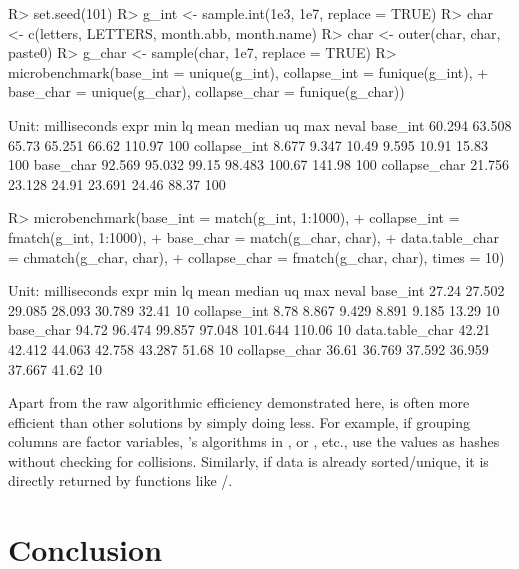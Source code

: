 \documentclass[nojss]{jss} %
\begin{document}
\begin{Schunk}
\begin{Sinput}
R> set.seed(101)
R> g_int <- sample.int(1e3, 1e7, replace = TRUE)
R> char <- c(letters, LETTERS, month.abb, month.name)
R> char <- outer(char, char, paste0)
R> g_char <- sample(char, 1e7, replace = TRUE)
R> microbenchmark(base_int = unique(g_int), collapse_int = funique(g_int),
+              base_char = unique(g_char), collapse_char = funique(g_char))
\end{Sinput}
\begin{Soutput}
Unit: milliseconds
          expr    min     lq  mean median     uq    max neval
      base_int 60.294 63.508 65.73 65.251  66.62 110.97   100
  collapse_int  8.677  9.347 10.49  9.595  10.91  15.83   100
     base_char 92.569 95.032 99.15 98.483 100.67 141.98   100
 collapse_char 21.756 23.128 24.91 23.691  24.46  88.37   100
\end{Soutput}
\begin{Sinput}
R> microbenchmark(base_int = match(g_int, 1:1000),
+                 collapse_int = fmatch(g_int, 1:1000),
+                 base_char = match(g_char, char),
+                 data.table_char = chmatch(g_char, char),
+                 collapse_char = fmatch(g_char, char), times = 10)
\end{Sinput}
\begin{Soutput}
Unit: milliseconds
            expr   min     lq   mean median      uq    max neval
        base_int 27.24 27.502 29.085 28.093  30.789  32.41    10
    collapse_int  8.78  8.867  9.429  8.891   9.185  13.29    10
       base_char 94.72 96.474 99.857 97.048 101.644 110.06    10
 data.table_char 42.21 42.412 44.063 42.758  43.287  51.68    10
   collapse_char 36.61 36.769 37.592 36.959  37.667  41.62    10
\end{Soutput}
\end{Schunk}
%
Apart from the raw algorithmic efficiency demonstrated here,  is often more efficient than other solutions by simply doing less. For example, if grouping columns are factor variables, 's algorithms in ,  or , etc., use the values as hashes without checking for collisions. Similarly, if data is already sorted/unique, it is directly returned by functions like /.

\newpage

\section{Conclusion} \label{sec:conclusion}
\end{document}
